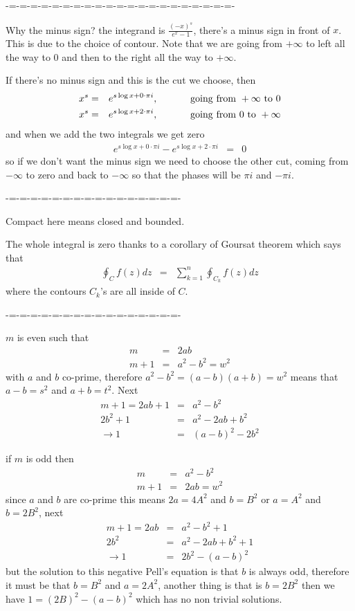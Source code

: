 \documentclass[aps,preprint,preprintnumbers,nofootinbib,showpacs,prd]{revtex4-1}
\newcommand{\nbea}{\begin{eqnarray*}}
\newcommand{\neea}{\end{eqnarray*}}
\begin{document}
-=-=-=-=-=-=-=-=-=-=-=-=-=-=-=-=-=-=-=-=-=-

Why the minus sign? the integrand is $\frac{(-x)^s}{e^x - 1}$, there's a minus sign in front of $x$. This is due to the choice of contour. Note that we are going from $+\infty$ to left all the way to 0 and then to the right all the way to $+\infty$.

If there's no minus sign and this is the cut we choose, then
%
\nbea
x^s & = & e^{s\log x + 0\cdot\pi i} , ~~~~~~~~~~ {\rm going~from~} +\infty {\rm ~to~} 0 \\
x^s & = & e^{s\log x + 2\cdot\pi i} , ~~~~~~~~~~ {\rm going~from~} 0 {\rm ~to~} +\infty
\neea
% 
and when we add the two integrals we get zero
%
\nbea
e^{s\log x + 0\cdot\pi i} - e^{s\log x + 2\cdot\pi i} & = & 0
\neea
%
so if we don't want the minus sign we need to choose the other cut, coming from $-\infty$ to zero and back to $-\infty$ so that the phases will be $\pi i$ and $-\pi i$.

-=-=-=-=-=-=-=-=-=-=-=-=-=-=-=-=-

Compact here means closed and bounded.

The whole integral is zero thanks to a corollary of Goursat theorem which says that
%
\nbea
\oint_C f(z) dz & = & \sum_{k=1}^n \oint_{C_k} f(z) dz
\neea
%
where the contours $C_k$'s are all inside of $C$.

-=-=-=-=-=-=-=-=-=-=-=-=-=-=-=-=-



$m$ is even such that
%
\nbea
m & = & 2ab \\
m + 1 & = & a^2 - b^2 = w^2
\neea
%
with $a$ and $b$ co-prime, therefore $a^2 - b^2 = (a-b)(a+b) = w^2$ means that $a-b = s^2$ and $a+b = t^2$. Next
%
\nbea
m + 1 = 2ab + 1 & = & a^2 - b^2 \\
2b^2 + 1 & = & a^2 - 2ab + b^2 \\
\to 1 & = & (a-b)^2 - 2b^2 
\neea
%


if $m$ is odd then
%
\nbea
m & = & a^2 - b^2 \\
m + 1 & = & 2ab = w^2
\neea
%
since $a$ and $b$ are co-prime this means $2a = 4A^2$ and $b = B^2$ or $a = A^2$ and $b = 2B^2$, next
%
\nbea
m + 1 = 2ab & = & a^2 - b^2 + 1 \\
2b^2 & = & a^2 - 2ab + b^2 + 1 \\
\to 1 & = & 2b^2 - (a-b)^2
\neea
%
but the solution to this negative Pell's equation is that $b$ is always odd, therefore it must be that $b = B^2$ and $a = 2A^2$, another thing is that is $b = 2B^2$ then we have $1 = (2B)^2 - (a - b)^2$ which has no non trivial solutions.
\end{document}
